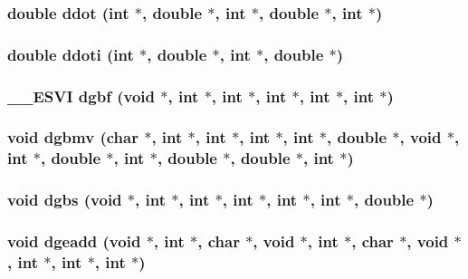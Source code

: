 \subsubsection{\setlength{\rightskip}{0pt plus 5cm}double ddot (int $\ast$, double $\ast$, int $\ast$, double $\ast$, int $\ast$)}\label{essl_8h_c60e00b47d605195d0d42894496b53e9}


\subsubsection{\setlength{\rightskip}{0pt plus 5cm}double ddoti (int $\ast$, double $\ast$, int $\ast$, double $\ast$)}\label{essl_8h_5ee1bb61f5831bc96c2d63860aff7c05}


\subsubsection{\setlength{\rightskip}{0pt plus 5cm}\_\-\_\-ESVI dgbf (void $\ast$, int $\ast$, int $\ast$, int $\ast$, int $\ast$, int $\ast$)}\label{essl_8h_23183914cf5b0a7585230bec7e4beb10}


\subsubsection{\setlength{\rightskip}{0pt plus 5cm}void dgbmv (char $\ast$, int $\ast$, int $\ast$, int $\ast$, int $\ast$, double $\ast$, void $\ast$, int $\ast$, double $\ast$, int $\ast$, double $\ast$, double $\ast$, int $\ast$)}\label{essl_8h_35411501130f43f04f54fc0764126044}


\subsubsection{\setlength{\rightskip}{0pt plus 5cm}void dgbs (void $\ast$, int $\ast$, int $\ast$, int $\ast$, int $\ast$, int $\ast$, double $\ast$)}\label{essl_8h_3075fc410197ef0557f5221a6bd505e1}


\subsubsection{\setlength{\rightskip}{0pt plus 5cm}void dgeadd (void $\ast$, int $\ast$, char $\ast$, void $\ast$, int $\ast$, char $\ast$, void $\ast$, int $\ast$, int $\ast$, int $\ast$)}\label{essl_8h_cdf062d8438453ece4adea7d05cd8e5c}


